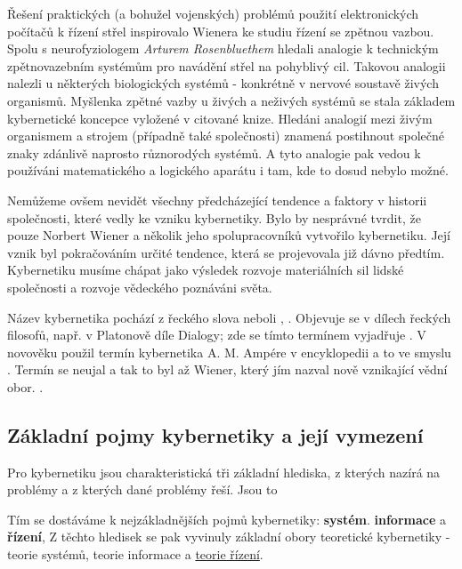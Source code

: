     Řešení praktických (a bohužel vojenských) problémů použití elektronických počítačů k řízení 
    střel inspirovalo Wienera ke studiu řízení se zpětnou vazbou. Spolu s neurofyziologem 
    \emph{Arturem Rosenbluethem} hledali analogie k technickým zpětnovazebním systémům pro navádění 
    střel na pohyblivý cil. Takovou analogii nalezli u některých biologických systémů - konkrétně v 
    nervové soustavě živých organismů. Myšlenka zpětné vazby u živých a neživých systémů se stala 
    základem kybernetické koncepce vyložené v citované knize. Hledáni analogií mezi živým 
    organismem a strojem (případně také společnosti) znamená postihnout společné znaky zdánlivě 
    naprosto různorodých systémů. A tyto analogie pak vedou k používáni matematického a logického 
    aparátu i tam, kde to dosud nebylo možné.
    
    Nemůžeme ovšem nevidět všechny předcházející tendence a faktory v historii společnosti, které 
    vedly ke vzniku kybernetiky. Bylo by nesprávné tvrdit, že pouze Norbert Wiener a několik jeho 
    spolupracovníků vytvořilo kybernetiku. Její vznik byl pokračováním určité tendence, která se 
    projevovala již dávno předtím. Kybernetiku musíme chápat jako výsledek rozvoje materiálních sil 
    lidské společnosti a rozvoje vědeckého poznáváni světa.
    
    Název kybernetika pochází z řeckého slova  neboli , . Objevuje se v dílech řeckých filosofů, např. v Platonově díle Dialogy; zde se 
    tímto termínem vyjadřuje . V 
    novověku použil termín kybernetika A. M. Ampére v encyklopedii a to ve smyslu . Termín se neujal a tak to byl až Wiener, který jím nazval nově vznikající vědní 
    obor. \cite[s.~6]{Svarc1986}.

    \subsection{Základní pojmy kybernetiky a její vymezení}
      Pro kybernetiku jsou charakteristická tři základní hlediska, z kterých nazírá na problémy a z 
      kterých dané problémy řeší. Jsou to

      
      
      Tím se dostáváme k nejzákladnějších pojmů kybernetiky: \textbf{systém}. \textbf{informace} a 
      \textbf{řízení}, Z těchto hledisek se pak vyvinuly základní obory teoretické kybernetiky - 
      teorie systémů, teorie informace a \hyperlink{tky:regulace}{teorie řízení}.
      

